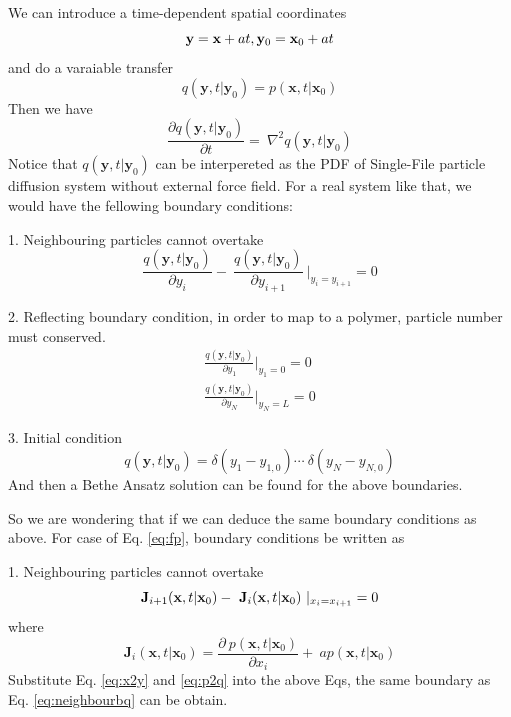 \documentclass[12pt,a4paper]{article}
\begin{document}
We can introduce a time-dependent spatial coordinates
\begin{equation}
    \label{eq:x2y}
    \mathbf{y} = \mathbf{x} + at, \mathbf{y}_0 = \mathbf{x}_0 + at \\
\end{equation}
and do a varaiable transfer
\begin{equation}
    \label{eq:p2q}
    q(\mathbf{y}, t|\mathbf{y}_0) = p(\mathbf{x},t|\mathbf{x}_0)
\end{equation}
Then we have
\begin{equation}
    \label{eq:diffusion}
    \frac{\partial q(\mathbf{y},t|\mathbf{y}_0)}{\partial t} = \
    \nabla^2 q(\mathbf{y},t|\mathbf{y}_0)
\end{equation}
Notice that $q(\mathbf{y},t|\mathbf{y}_0)$ can be interpereted as the PDF of
Single-File particle diffusion system without external force field. For a real
system like that, we would have the fellowing boundary conditions:

1. Neighbouring particles cannot overtake
\begin{equation}
    \label{eq:neighbourbq}
    \frac{q(\mathbf{y},t|\mathbf{y}_0)}{\partial y_i} -  \
    \frac{q(\mathbf{y},t|\mathbf{y}_0)}{\partial y_{i+1}} \
    |_{y_{i} = y_{i+1}} = 0
\end{equation}

2. Reflecting boundary condition, in order to map to a polymer, particle number
must conserved. 
\begin{eqnarray}
    \label{eq:reflectbq}
    \frac{q(\mathbf{y},t|\mathbf{y}_0)}{\partial y_1}|_{y_1 = 0} = 0 \\
    \frac{q(\mathbf{y},t|\mathbf{y}_0)}{\partial y_N}|_{y_N = L} = 0
\end{eqnarray}

3. Initial condition
\begin{equation}
    q(\mathbf{y}, t|\mathbf{y}_0) = \delta(y_1 - y_{1,0})\cdots\
    \delta(y_N - y_{N,0})
\end{equation}
And then a Bethe Ansatz solution can be found for the above boundaries.

So we are wondering that if we can deduce the same boundary conditions as above.
For case of Eq. \ref{eq:fp}, boundary conditions be written as 

1. Neighbouring particles cannot overtake
\begin{equation}
    \mathbf{J}_{i+1}(\mathbf{x},t|\mathbf{x}_0) - \
    \mathbf{J}_{i}(\mathbf{x},t|\mathbf{x}_0) \
    |_{x_{i} = x_{i+1}} = 0 \\
\end{equation}
where
\begin{equation}
    \label{eq:fluxi}
    \mathbf{J}_{i}(\mathbf{x},t|\mathbf{x}_0) = \frac{\partial \
        p(\mathbf{x},t|\mathbf{x}_0)}{\partial x_i} +  \
        ap(\mathbf{x},t|\mathbf{x}_0)
\end{equation}
Substitute Eq. \ref{eq:x2y} and \ref{eq:p2q} into the above Eqs, the same boundary
as Eq. \ref{eq:neighbourbq} can be obtain.
\end{document}

